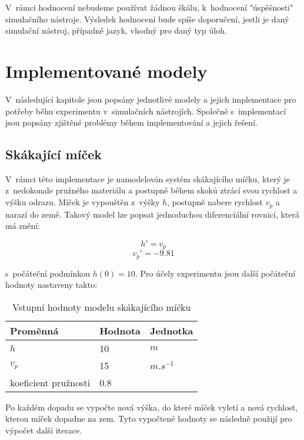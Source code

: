 V~rámci hodnocení nebudeme používat žádnou škálu, k~hodnocení "úspěšnosti" simulačního nástroje. Výsledek hodnocení bude spíše doporučení, jestli je daný simulační nástroj, případně jazyk, vhodný pro daný typ úloh.


\section{Implementované modely}
\label{implementace}
V~následující kapitole jsou popsány jednotlivé modely a jejich implementace pro potřeby běhu experimentu v~simulačních nástrojích. Společně s~implementací jsou popsány zjištěné problémy během implementování a jejich řešení.

\subsection*{Skákající míček}
\label{micek-desc}
V~rámci této implementace je namodelován systém skákajícího míčku, který je z~nedokonale pružného materiálu a postupně během skoků ztrácí svou rychlost a výšku odrazu. Míček je vypouštěn z~výšky $h$, postupně nabere rychlost $v_p$ a narazí do země. Takový model lze popsat jednoduchou diferenciální rovnicí, která má znění:

\begin{equation}
    h' = v_p
\end{equation}
\begin{equation}
    v_p ' = -9.81
\end{equation}

s~počáteční podmínkou $h(0) = 10$. Pro účely experimentu jsou další počáteční hodnoty nastaveny takto:

\begin{center}
\begin{table}[ht]
    \centering
\begin{tabular}{|l|l|l|}
\hline
Proměnná             & Hodnota & Jednotka    \\ \hline
$h$                    &   10     & $m$     \\ \hline
$v_p$                   &    15   & $m.s^{-1}$ \\ \hline
koeficient pružnosti &  0.8    &             \\ \hline
\end{tabular}
    \caption{Vstupní hodnoty modelu skákajícího míčku}
    \label{tab:micek-hodnoty}
\end{table}
\end{center}
Po každém dopadu se vypočte nová výška, do které míček vyletí a nová rychlost, kterou míček dopadne na zem. Tyto vypočtené hodnoty se následně použijí pro výpočet další iterace.

